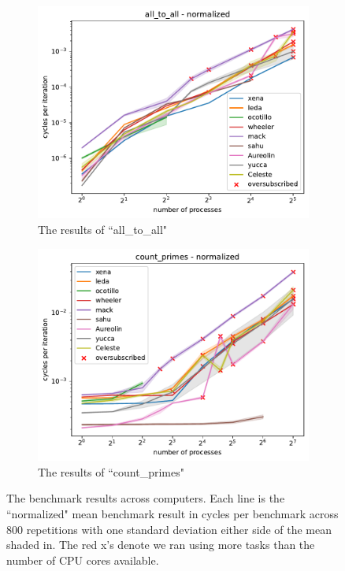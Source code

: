 \documentclass{article}
\begin{document}
\begin{figure}[h]
    \centering
    \begin{subfigure}[b]{0.49\textwidth}
         \centering
         \includegraphics[width=\textwidth]{figures/final/all_to_all_normalized.pdf}
         \caption{The results of ``all\_to\_all"}
         \label{fig:all_to_all}
     \end{subfigure}
     \hfill
     \begin{subfigure}[b]{0.49\textwidth}
         \centering
         \includegraphics[width=\textwidth]{figures/final/count_primes_normalized.pdf}
         \caption{The results of ``count\_primes"}
         \label{fig:count_primes}
     \end{subfigure}
     \hfill
    \caption{The benchmark results across computers. Each line is the ``normalized" mean benchmark result in cycles per benchmark across 800 repetitions with one standard deviation either side of the mean shaded in. The red x's denote we ran using more tasks than the number of CPU cores available. }
    \label{fig:normalized}
\end{figure}
\end{document}
